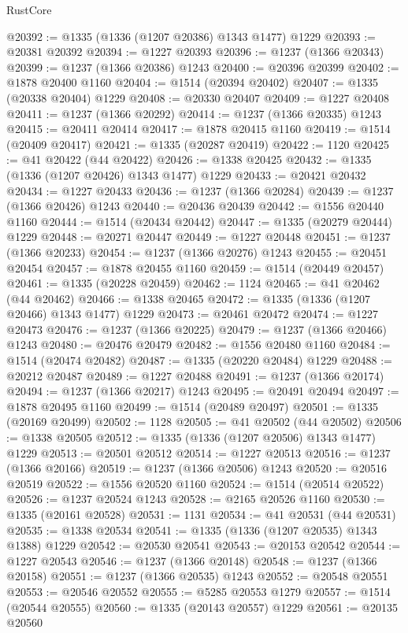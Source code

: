 \begin{lexlean}{RustCore}
\begin{coremodule}
@20392 := @1335 (@1336 (@1207 @20386) @1343 @1477) @1229
@20393 := @20381 @20392
@20394 := @1227 @20393
@20396 := @1237 (@1366 @20343)
@20399 := @1237 (@1366 @20386) @1243
@20400 := @20396 @20399
@20402 := @1878 @20400 @1160
@20404 := @1514 (@20394 @20402)
@20407 := @1335 (@20338 @20404) @1229
@20408 := @20330 @20407
@20409 := @1227 @20408
@20411 := @1237 (@1366 @20292)
@20414 := @1237 (@1366 @20335) @1243
@20415 := @20411 @20414
@20417 := @1878 @20415 @1160
@20419 := @1514 (@20409 @20417)
@20421 := @1335 (@20287 @20419)
@20422 := 1120
@20425 := @41 @20422 (@44 @20422)
@20426 := @1338 @20425
@20432 := @1335 (@1336 (@1207 @20426) @1343 @1477) @1229
@20433 := @20421 @20432
@20434 := @1227 @20433
@20436 := @1237 (@1366 @20284)
@20439 := @1237 (@1366 @20426) @1243
@20440 := @20436 @20439
@20442 := @1556 @20440 @1160
@20444 := @1514 (@20434 @20442)
@20447 := @1335 (@20279 @20444) @1229
@20448 := @20271 @20447
@20449 := @1227 @20448
@20451 := @1237 (@1366 @20233)
@20454 := @1237 (@1366 @20276) @1243
@20455 := @20451 @20454
@20457 := @1878 @20455 @1160
@20459 := @1514 (@20449 @20457)
@20461 := @1335 (@20228 @20459)
@20462 := 1124
@20465 := @41 @20462 (@44 @20462)
@20466 := @1338 @20465
@20472 := @1335 (@1336 (@1207 @20466) @1343 @1477) @1229
@20473 := @20461 @20472
@20474 := @1227 @20473
@20476 := @1237 (@1366 @20225)
@20479 := @1237 (@1366 @20466) @1243
@20480 := @20476 @20479
@20482 := @1556 @20480 @1160
@20484 := @1514 (@20474 @20482)
@20487 := @1335 (@20220 @20484) @1229
@20488 := @20212 @20487
@20489 := @1227 @20488
@20491 := @1237 (@1366 @20174)
@20494 := @1237 (@1366 @20217) @1243
@20495 := @20491 @20494
@20497 := @1878 @20495 @1160
@20499 := @1514 (@20489 @20497)
@20501 := @1335 (@20169 @20499)
@20502 := 1128
@20505 := @41 @20502 (@44 @20502)
@20506 := @1338 @20505
@20512 := @1335 (@1336 (@1207 @20506) @1343 @1477) @1229
@20513 := @20501 @20512
@20514 := @1227 @20513
@20516 := @1237 (@1366 @20166)
@20519 := @1237 (@1366 @20506) @1243
@20520 := @20516 @20519
@20522 := @1556 @20520 @1160
@20524 := @1514 (@20514 @20522)
@20526 := @1237 @20524 @1243
@20528 := @2165 @20526 @1160
@20530 := @1335 (@20161 @20528)
@20531 := 1131
@20534 := @41 @20531 (@44 @20531)
@20535 := @1338 @20534
@20541 := @1335 (@1336 (@1207 @20535) @1343 @1388) @1229
@20542 := @20530 @20541
@20543 := @20153 @20542
@20544 := @1227 @20543
@20546 := @1237 (@1366 @20148)
@20548 := @1237 (@1366 @20158)
@20551 := @1237 (@1366 @20535) @1243
@20552 := @20548 @20551
@20553 := @20546 @20552
@20555 := @5285 @20553 @1279
@20557 := @1514 (@20544 @20555)
@20560 := @1335 (@20143 @20557) @1229
@20561 := @20135 @20560

\end{coremodule}
\end{lexlean}
